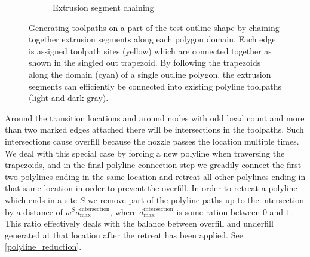 \begin{figure}
\begin{subfigure}{.45\columnwidth}
\caption{Extrusion segment chaining}\label{shape_decomposition_domains}
\end{subfigure}
\caption{
Generating toolpaths on a part of the test outline shape by chaining together extrusion segments along each polygon domain.
Each edge is assigned toolpath sites (yellow) which are connected together as shown in the singled out trapezoid.
By following the trapezoids along the domain (cyan) of a single outline polygon,
the extrusion segments can efficiently be connected into existing polyline toolpaths (light and dark gray).
}
\label{segment_generation}
\end{figure}


Around the transition locations and around nodes with odd bead count and more than two marked edges attached there will be intersections in the toolpaths.
Such intersections cause overfill because the nozzle passes the location multiple times.
We deal with this special case by forcing a new polyline when traversing the trapezoids, and in the final polyline connection step we greadily connect the first two polylines ending in the same location and retreat all other polylines ending in that same location in order to prevent the overfill.
In order to retreat a polyline which ends in a site $S$ we remove part of the polyline paths up to the intersection by a distance of $w^S d_\text{max}^\text{intersection}$, where $d_\text{max}^\text{intersection}$ is some ration between $0$ and $1$.
This ratio effectively deals with the balance between overfill and underfill generated at that location after the retreat has been applied.
See \cref{polyline_reduction}.


